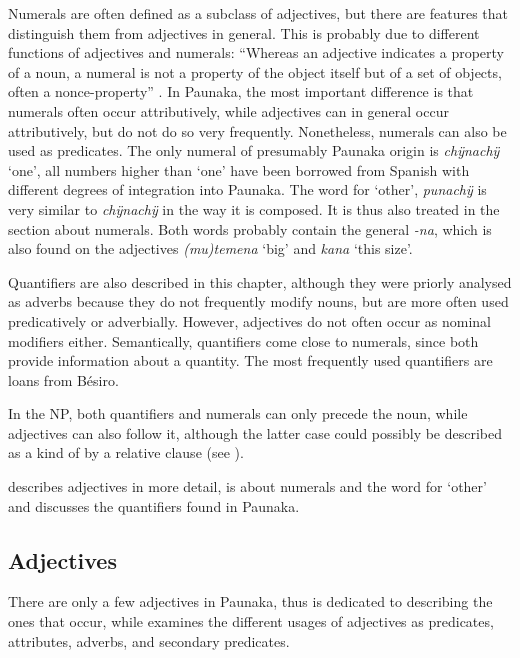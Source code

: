 Numerals are often defined as a subclass of adjectives, but there are features that distinguish them from adjectives in general. This is probably due to different functions of adjectives and numerals: “Whereas an adjective indicates a property of a noun, a numeral is not a property of the object itself but of a set of objects, often a nonce-property” \citep[770]{Greenberg2000}. In Paunaka, the most important difference is that numerals often occur attributively, while adjectives can in general occur attributively, but do not do so very frequently. Nonetheless, numerals can also be used as predicates. The only numeral of presumably Paunaka origin is \textit{chÿnachÿ} ‘one’, all numbers higher than ‘one’ have been borrowed from Spanish with different degrees of integration into Paunaka. The word for ‘other’, \textit{punachÿ} is very similar to \textit{chÿnachÿ} in the way it is composed. It is thus also treated in the section about numerals. Both words probably contain the general  \textit{-na}, which is also found on the adjectives \textit{(mu)temena} ‘big’ and \textit{kana} ‘this size’.

Quantifiers are also described in this chapter, although they were priorly analysed as adverbs because they do not frequently modify nouns, but are more often used predicatively or adverbially. However, adjectives do not often occur as nominal modifiers either. Semantically, quantifiers come close to numerals, since both provide information about a quantity. The most frequently used quantifiers are loans from Bésiro.

In the NP, both quantifiers and numerals can only precede the noun, while adjectives can also follow it, although the latter case could possibly be described as a kind of  by a relative clause (see ).

 describes adjectives in more detail,  is about numerals and the word for ‘other’ and  discusses the quantifiers found in Paunaka.

\subsection{Adjectives}\label{sec:Adjectives}

There are only a few adjectives in Paunaka, thus  is dedicated to describing the ones that occur, while  examines the different usages of adjectives as predicates, attributes, adverbs, and secondary predicates.


